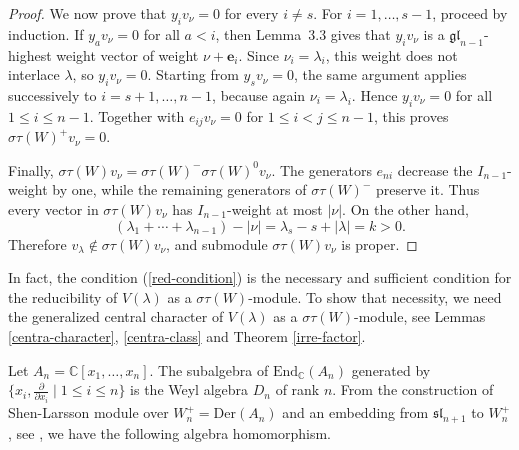 \documentclass[12pt,a4paper]{amsart}
\newtheorem{remark}[theorem]{Remark}%
\numberwithin{equation}{section}
\newcommand{\C}{\mathbb C}
\def\sl{\mathfrak{sl}}
\begin{document}
\begin{proof}
We now prove that $y_iv_\nu=0$ for every $i\neq s$. For
$i=1,\ldots,s-1$, proceed by induction. If $y_av_\nu=0$ for all $a<i$,
then Lemma~3.3 gives that $y_iv_\nu$ is a
$\mathfrak{gl}_{n-1}$-highest weight vector of weight
$\nu+\mathbf e_i$. Since $\nu_i=\lambda_i$, this weight does not interlace
$\lambda$, so $y_iv_\nu=0$. Starting from $y_sv_\nu=0$, the same argument
applies successively to $i=s+1,\ldots,n-1$, because again
$\nu_i=\lambda_i$. Hence $y_iv_\nu=0$ for all $1\leq i\leq n-1$.
Together with $e_{ij}v_\nu=0$ for $1\leq i<j\leq n-1$, this proves
$\sigma\tau(W)^+v_\nu=0$.

Finally,
$\sigma\tau(W)v_\nu=\sigma\tau(W)^-\sigma\tau(W)^0v_\nu$. The generators
$e_{ni}$ decrease the $I_{n-1}$-weight by one, while the remaining
generators of $\sigma\tau(W)^-$ preserve it. Thus every vector in
$\sigma\tau(W)v_\nu$ has $I_{n-1}$-weight at most $|\nu|$. On the other
hand,
\[
 (\lambda_1+\cdots+\lambda_{n-1})-|\nu|
 =\lambda_s-s+|\lambda|=k>0.
\]
Therefore $v_\lambda\notin\sigma\tau(W)v_\nu$, and 
submodule $\sigma\tau(W)v_\nu$ is proper.
\end{proof}







In fact, the condition (\ref{red-condition}) is the necessary and sufficient condition for the reducibility of  $V(\lambda)$ as a $\sigma\tau(W)$-module.
To show that  necessity, we need the  generalized central character of $V(\lambda)$ as a $\sigma\tau(W)$-module, see Lemmas \ref{centra-character}, \ref{centra-class} and Theorem \ref{irre-factor}.

Let $A_{n}= \C [x_1, \dots, x_{n}]$.
The subalgebra of $\text{End}_{\C}(A_{n})$  generated by $\{x_i,\frac{\partial}{\partial x_i}\mid 1\leq i\leq n\}  $ is the Weyl algebra $D_{n}$ of rank $n$. From the construction of Shen-Larsson module over  $W^+_n=\mathrm{Der}(A_n)$ and an embedding from
$\sl_{n+1}$ to $W_n^+$,  see \cite{Sh,LLZ}, we have the following algebra homomorphism.
\end{document}
